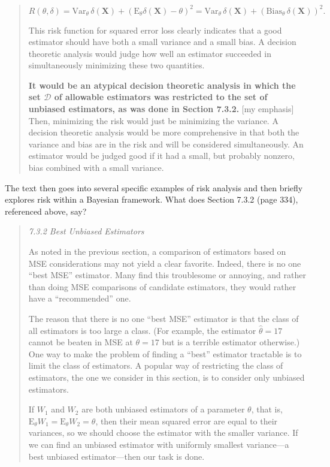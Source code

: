 \documentclass[english]{article}
\begin{document}
\begin{quote}
\[
R(\theta,\delta)=\mathrm{Var}_{\theta}\,\delta(\mathbf{X})+(\mathrm{E}_{\theta}\delta(\mathbf{X})-\theta)^{2}=\mathrm{Var}_{\theta}\,\delta(\mathbf{X})+(\mathrm{Bias}_{\theta}\,\delta(\mathbf{X}))^{2}.
\]

This risk function for squared error loss clearly indicates that a
good estimator should have both a small variance and a small bias.
A decision theoretic analysis would judge how well an estimator succeeded
in simultaneously minimizing these two quantities.

\textbf{It would be an atypical decision theoretic analysis in which
the set $\boldsymbol{\mathcal{D}}$ of allowable estimators was restricted
to the set of unbiased estimators, as was done in Section 7.3.2.}
{[}my emphasis{]} Then, minimizing the risk would just be minimizing
the variance. A decision theoretic analysis would be more comprehensive
in that both the variance and bias are in the risk and will be considered
simultaneously. An estimator would be judged good if it had a small,
but probably nonzero, bias combined with a small variance.
\end{quote}
The text then goes into several specific examples of risk analysis
and then briefly explores risk within a Bayesian framework. What does
Section 7.3.2 (page 334), referenced above, say?
\begin{quote}
\textit{7.3.2 Best Unbiased Estimators}

As noted in the previous section, a comparison of estimators based
on MSE considerations may not yield a clear favorite. Indeed, there
is no one ``best MSE'' estimator. Many find this troublesome or
annoying, and rather than doing MSE comparisons of candidate estimators,
they would rather have a ``recommended'' one.

The reason that there is no one ``best MSE'' estimator is that the
class of all estimators is too large a class. (For example, the estimator
$\hat{\theta}=17$ cannot be beaten in MSE at $\theta=17$ but is
a terrible estimator otherwise.) One way to make the problem of finding
a ``best'' estimator tractable is to limit the class of estimators.
A popular way of restricting the class of estimators, the one we consider
in this section, is to consider only unbiased estimators.

If $W_{1}$ and $W_{2}$ are both unbiased estimators of a parameter
$\theta$, that is, $\mathrm{E}_{\theta}W_{1}=\mathrm{E}_{\theta}W_{2}=\theta$,
then their mean squared error are equal to their variances, so we
should choose the estimator with the smaller variance. If we can find
an unbiased estimator with uniformly smallest variance---a best unbiased
estimator---then our task is done.
\end{quote}
\end{document}

